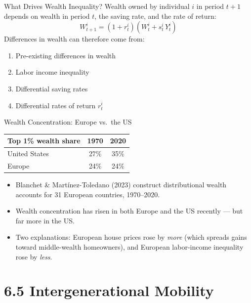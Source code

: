 \documentclass[11pt,aspectratio=169]{beamer}
\begin{document}
\begin{frame}{What Drives Wealth Inequality?}
  \small
  Wealth owned by individual $i$ in period $t+1$ depends on wealth in period $t$, the saving rate, and the rate of return:
  \[
    W^i_{t+1} = (1+r^i_t)\left(W^i_t + s^i_t \, Y^i_t\right)
  \]
  \vspace{0.2em}
  Differences in wealth can therefore come from:
  \begin{enumerate}
    \item Pre-existing differences in wealth
    \item Labor income inequality
    \item Differential saving rates
    \item Differential rates of return $r^i_t$
  \end{enumerate}
\end{frame}

\begin{frame}{Wealth Concentration: Europe vs.\ the US}
  \small
  \begin{center}
  \begin{tabular}{@{}lcc@{}}
    \toprule
    \textbf{Top 1\% wealth share} & \textbf{1970} & \textbf{2020} \\
    \midrule
    United States & 27\% & 35\% \\
    Europe & 24\% & 24\% \\
    \bottomrule
  \end{tabular}
  \end{center}
  \vspace{0.3em}
  \begin{itemize}
    \item Blanchet \& Martínez-Toledano (2023) construct distributional wealth accounts for 31 European countries, 1970--2020.
    \item Wealth concentration has risen in both Europe and the US recently --- but far more in the US.
    \item Two explanations: European house prices rose by \emph{more} (which spreads gains toward middle-wealth homeowners), and European labor-income inequality rose by \emph{less}.
  \end{itemize}
\end{frame}

\section{6.5 Intergenerational Mobility}
\end{document}
